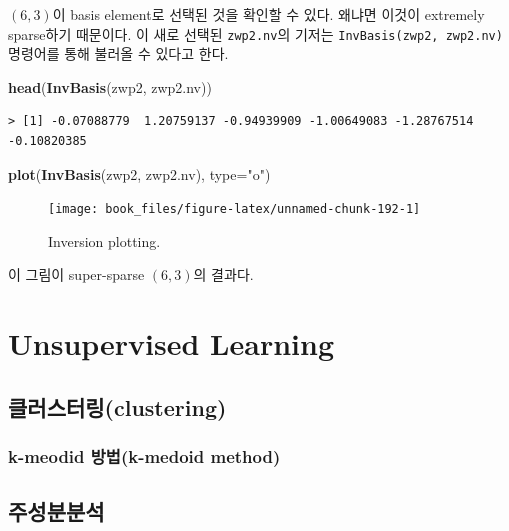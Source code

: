 \documentclass[b5paper,]{scrbook}
\makeatletter
\newenvironment{Shaded}{\begin{snugshade}}{\end{snugshade}}
\newcommand{\KeywordTok}[1]{\textcolor[rgb]{0.13,0.29,0.53}{\textbf{{#1}}}}
\newcommand{\DataTypeTok}[1]{\textcolor[rgb]{0.13,0.29,0.53}{{#1}}}
\newcommand{\StringTok}[1]{\textcolor[rgb]{0.31,0.60,0.02}{{#1}}}
\newcommand{\NormalTok}[1]{{#1}}
\theoremstyle{plain}
\theoremstyle{definition}
\numberwithin{equation}{section}
\newenvironment{kframe}{%
\medskip{}
\setlength{\fboxsep}{.8em}
 \def\at@end@of@kframe{}%
 \ifinner\ifhmode%
  \def\at@end@of@kframe{\end{minipage}}%
  \begin{minipage}{\columnwidth}%
 \fi\fi%
 \def\FrameCommand##1{\hskip\@totalleftmargin \hskip-\fboxsep
 \colorbox{shadecolor}{##1}\hskip-\fboxsep
     \hskip-\linewidth \hskip-\@totalleftmargin \hskip\columnwidth}%
 \MakeFramed {\advance\hsize-\width
   \@totalleftmargin\z@ \linewidth\hsize
   \@setminipage}}%
 {\par\unskip\endMakeFramed%
 \at@end@of@kframe}
\renewenvironment{Shaded}{\begin{kframe}}{\end{kframe}}
\makeatother
\begin{document}
\((6,3)\)이 basis element로 선택된 것을 확인할 수 있다. 왜냐면 이것이
extremely sparse하기 때문이다. 이 새로 선택된 \texttt{zwp2.nv}의 기저는
\texttt{InvBasis(zwp2,\ zwp2.nv)} 명령어를 통해 불러올 수 있다고 한다.

\begin{Shaded}
\begin{Highlighting}[]
\KeywordTok{head}\NormalTok{(}\KeywordTok{InvBasis}\NormalTok{(zwp2, zwp2.nv))}
\end{Highlighting}
\end{Shaded}

\begin{verbatim}
> [1] -0.07088779  1.20759137 -0.94939909 -1.00649083 -1.28767514 -0.10820385
\end{verbatim}

\begin{Shaded}
\begin{Highlighting}[]
\KeywordTok{plot}\NormalTok{(}\KeywordTok{InvBasis}\NormalTok{(zwp2, zwp2.nv), }\DataTypeTok{type=}\StringTok{"o"}\NormalTok{)}
\end{Highlighting}
\end{Shaded}

\begin{figure}

{\centering \texttt{[image: book\_files/figure-latex/unnamed-chunk-192-1]} 

}

\caption{Inversion plotting.}\label{fig:unnamed-chunk-192}
\end{figure}

이 그림이 super-sparse \((6,3)\)의 결과다.

\part{Unsupervised
Learning}\label{part-unsupervised-learning}

\chapter{클러스터링(clustering)}\label{clustering}

\section{k-meodid 방법(k-medoid method)}\label{k-meodid-k-medoid-method}

\chapter{주성분분석}\label{PCA}
\end{document}
